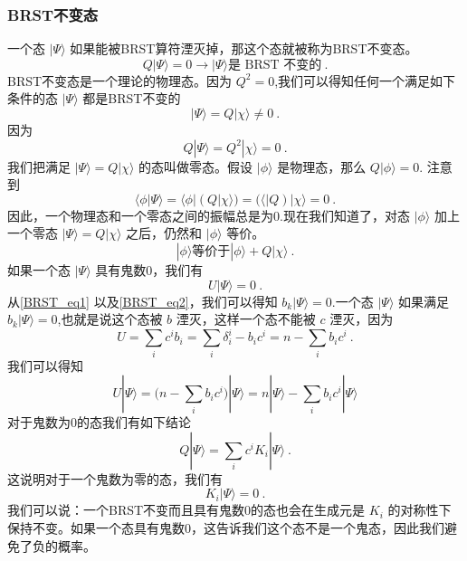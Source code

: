 \subsubsection{BRST不变态}
一个态 $|\Psi\rangle$ 如果能被BRST算符湮灭掉，那这个态就被称为BRST不变态。
\begin{equation}
Q|\Psi\rangle = 0 \rightarrow |\Psi\rangle \text{是 BRST 不变的}~.
\end{equation}
BRST不变态是一个理论的物理态。因为 $Q^2=0$,我们可以得知任何一个满足如下条件的态 $|\Psi\rangle$ 都是BRST不变的
\begin{equation}
|\Psi\rangle = Q |\chi\rangle \neq 0~.
\end{equation}
因为
\begin{equation}
Q|\Psi\rangle = Q^2 |\chi\rangle = 0~.
\end{equation}
我们把满足 $|\Psi\rangle=Q|\chi\rangle$ 的态叫做零态。假设 $|\phi\rangle$ 是物理态，那么 $Q|\phi\rangle=0$. 注意到
\begin{equation}
\langle\phi|\Psi\rangle = \langle\phi|(Q|\chi\rangle) = (\langle | Q) |\chi\rangle = 0~.
\end{equation}
因此，一个物理态和一个零态之间的振幅总是为0.现在我们知道了，对态 $|\phi\rangle$ 加上一个零态 $|\Psi\rangle = Q|\chi\rangle$ 之后，仍然和 $|\phi\rangle$ 等价。
\begin{equation}
|\phi\rangle \text{等价于} |\phi\rangle+Q|\chi\rangle~.
\end{equation}
如果一个态 $|\Psi\rangle$ 具有鬼数0，我们有
\begin{equation}\label{BRST_eq2}
U|\Psi\rangle = 0~.
\end{equation}
从\autoref{BRST_eq1} 以及\autoref{BRST_eq2}，我们可以得知 $b_k|\Psi\rangle = 0$.一个态 $|\Psi\rangle$ 如果满足 $b_k|\Psi\rangle = 0$,也就是说这个态被 $b$ 湮灭，这样一个态不能被 $c$ 湮灭，因为
\begin{equation}
U = \sum_i c^i b_i = \sum_i \delta^i_i - b_i c^i = n - \sum_i b_i c^i~.
\end{equation}
我们可以得知
\begin{equation}
U|\Psi\rangle = \bigg( n - \sum_i b_i c^i \bigg) | \Psi\rangle = n|\Psi\rangle - \sum_i b_i c^i |\Psi\rangle
\end{equation}
对于鬼数为0的态我们有如下结论
\begin{equation}
Q|\Psi\rangle = \sum_i c^i K_i |\Psi\rangle~.
\end{equation}
这说明对于一个鬼数为零的态，我们有
\begin{equation}
K_i|\Psi\rangle = 0~.
\end{equation}
我们可以说：一个BRST不变而且具有鬼数0的态也会在生成元是 $K_i$ 的对称性下保持不变。如果一个态具有鬼数0，这告诉我们这个态不是一个鬼态，因此我们避免了负的概率。

